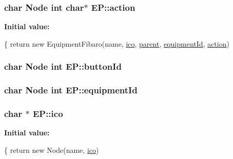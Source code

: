 \subsubsection[{\texorpdfstring{action}{action}}]{\setlength{\rightskip}{0pt plus 5cm}char {\bf Node} int char$\ast$ E\+P\+::action}\hypertarget{namespace_e_p_a3f543204ed06fa87d908e9f15faf0c2a}{}\label{namespace_e_p_a3f543204ed06fa87d908e9f15faf0c2a}
{\bfseries Initial value\+:}
\begin{DoxyCode}
\{
        \textcolor{keywordflow}{return} \textcolor{keyword}{new} EquipmentFibaro(name, \hyperlink{namespace_e_p_a9bb18717237cbb94269e26c77cc04b05}{ico}, \hyperlink{namespace_e_p_ae54856cdea91964313d781ec414f88fc}{parent}, \hyperlink{namespace_e_p_a720661c6f3b93cc86d108b686beac651}{equipmentId}, 
      \hyperlink{namespace_e_p_a3f543204ed06fa87d908e9f15faf0c2a}{action})
\end{DoxyCode}
\subsubsection[{\texorpdfstring{button\+Id}{buttonId}}]{\setlength{\rightskip}{0pt plus 5cm}char {\bf Node} int E\+P\+::button\+Id}\hypertarget{namespace_e_p_af35e4c78a6ab0ddc628032ea5894199a}{}\label{namespace_e_p_af35e4c78a6ab0ddc628032ea5894199a}
\subsubsection[{\texorpdfstring{equipment\+Id}{equipmentId}}]{\setlength{\rightskip}{0pt plus 5cm}char {\bf Node} int E\+P\+::equipment\+Id}\hypertarget{namespace_e_p_a720661c6f3b93cc86d108b686beac651}{}\label{namespace_e_p_a720661c6f3b93cc86d108b686beac651}
\subsubsection[{\texorpdfstring{ico}{ico}}]{\setlength{\rightskip}{0pt plus 5cm}char $\ast$ E\+P\+::ico}\hypertarget{namespace_e_p_a9bb18717237cbb94269e26c77cc04b05}{}\label{namespace_e_p_a9bb18717237cbb94269e26c77cc04b05}
{\bfseries Initial value\+:}
\begin{DoxyCode}
\{
        \textcolor{keywordflow}{return} \textcolor{keyword}{new} Node(name, \hyperlink{namespace_e_p_a9bb18717237cbb94269e26c77cc04b05}{ico})
\end{DoxyCode}
